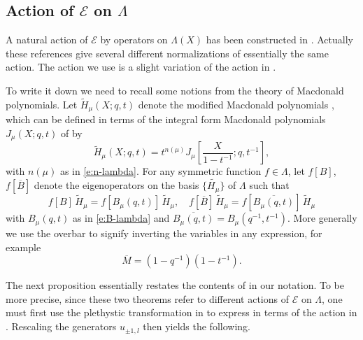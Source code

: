 \documentclass[12pt]{amsart}
\theoremstyle{definition}
\theoremstyle{remark}
\newcommand{\Ecal}{{\mathcal E}}
\newcommand{\Htild}{\tilde{H}}
\begin{document}
\subsection{Action of \texorpdfstring{$\Ecal $}{E} on
\texorpdfstring{$\Lambda $}{\textLambda}}
\label{ss:E-action}

A natural action of $\Ecal $ by operators on $\Lambda (X)$ has been
constructed in \cite{FeigTsym11,SchiVass13}.  Actually these
references give several different normalizations of essentially the
same action.  The action we use is a slight variation of the action in
\cite[Theorem 3.1]{SchiVass13}.

To write it down we need to recall some notions from the theory of
Macdonald polynomials.  Let $\Htild _{\mu }(X;q,t)$ denote the
modified Macdonald polynomials \cite{GarsHaim96}, which can be defined
in terms of the integral form Macdonald polynomials $J_{\mu }(X;q,t)$ of
\cite{Macdonald95} by
\begin{equation}\label{e:H-tilde}
\Htild _{\mu }(X;q,t) = t^{n(\mu )} J_{\mu
}[\frac{X}{1-t^{-1}};q,t^{-1}],
\end{equation}
with $n(\mu )$ as in \eqref{e:n-lambda}.  For any symmetric function
$f\in \Lambda $, let $f[B]$, $f[\overline{B}]$ denote the
eigenoperators on the basis $\{\tilde{H_{\mu }} \}$ of $\Lambda $ such
that
\begin{equation}\label{e:eigenoperators}
f[B]\, \Htild _{\mu } = f[B_{\mu }(q,t)]\, \Htild _{\mu },\quad
f[\overline{B}]\, \Htild _{\mu } = f[\overline{B_{\mu }(q,t)}]\, \Htild
_{\mu }
\end{equation}
with $B_{\mu }(q,t)$ as in \eqref{e:B-lambda} and $\overline{B_{\mu
}(q,t)} = B_{\mu }(q^{-1},t^{-1})$.  More generally we use the overbar
to signify inverting the variables in any expression, for example
\begin{equation}\label{e:M-bar}
\overline{M} = (1-q^{-1})(1-t^{-1}).
\end{equation}


The next proposition essentially restates the contents of
\cite[Theorem 3.1 and Proposition 4.10]{SchiVass13} in our notation.
To be more precise, since these two theorems refer to different
actions of $\Ecal $ on $\Lambda $, one must first use the plethystic
transformation in \cite[\S 4.4]{SchiVass13} to express
\cite[Proposition 4.10]{SchiVass13} in terms of the action in
\cite[Theorem 3.1]{SchiVass13}.  Rescaling the generators $u_{\pm
1,l}$ then yields the following.
\end{document}
